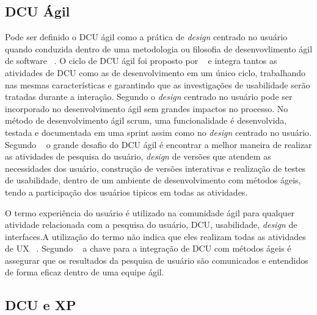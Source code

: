 \subsection{DCU Ágil}

Pode ser definido o DCU ágil como a prática de \emph{design} centrado no usuário quando conduzida dentro de uma metodologia ou filosofia de desenvovlimento ágil de software ~\cite{santos2012}.
%
O ciclo de DCU ágil foi proposto por ~ e integra tantos as atividades de DCU como as de desenvolvimento em um único ciclo, trabalhando nas mesmas características e garantindo que as investigações de usabilidade serão tratadas durante a interação.
%
Segundo  o \emph{design} centrado no usuário pode ser incorporado no desenvolvimento ágil sem grandes impactos no processo. No método de desenvolvimento ágil scrum, uma funcionalidade é desenvolvida, testada e documentada em uma sprint assim como no \emph{design} centrado no usuário. 
%	
Segundo ~ o grande desafio do DCU ágil é encontrar a melhor maneira de realizar as atividades de pesquisa do usuário, \emph{design} de versões que atendem as necessidades dos usuário, construção de versões interativas e realização de testes de usabilidade, dentro de um ambiente de desenvolvimento com métodos ágeis, tendo a participação dos usuários tipicos em todas as atividades.


O termo experiência do usuário é utilizado na comunidade ágil para qualquer atividade relacionada com a pesquisa do usuário, DCU, usabilidade, \emph{design} de interfaces.A utilização do termo não indica que eles realizam todas as atividades de UX ~\cite{santos2012}.
%
Segundo ~ a chave para a integração de DCU com métodos ágeis é assegurar que os resultados da pesquisa de usuário são comunicados e entendidos de forma eficaz dentro de uma equipe ágil.


\subsection {DCU e XP}

